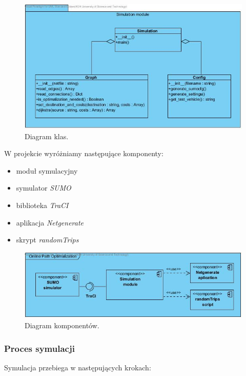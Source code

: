 \documentclass[11pt,a4paper]{article}
\begin{document}
\begin{figure}[H]
	\centering
		\includegraphics[width=\textwidth]{../images/class_diagram}
	\caption{Diagram klas.}
\end{figure}

W projekcie wyróżniamy następujące komponenty:
\begin{itemize}
	\item moduł symulacyjny
	\item symulator \emph{SUMO}
	\item biblioteka \emph{TraCI}
	\item aplikacja \emph{Netgenerate}
	\item skrypt \emph{randomTrips}
\end{itemize}

\begin{figure}[H]
	\centering
		\includegraphics[width=\textwidth]{../images/component_diagram}
	\caption{Diagram komponentów.}
\end{figure}


\subsubsection{Proces symulacji}

Symulacja przebiega w następujących krokach:
\end{document}
